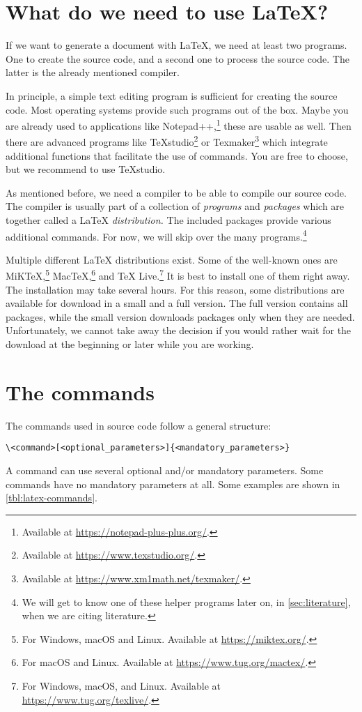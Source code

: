 \section{What do we need to use \LaTeX{}?}
\label{subsec:what-we-need}

If we want to generate a  document with \LaTeX{}, we need at least two programs. 
One to create the source code, and a second one to process the source code. 
The latter is the already mentioned compiler.

In principle, a simple text editing program is sufficient for creating the source code. 
Most operating systems provide such programs out of the box. 
Maybe you are already used to applications like Notepad++,\footnote{Available at \url{https://notepad-plus-plus.org/}.} these are usable as well. 
Then there are advanced programs like \TeX{}studio\footnote{Available at \url{https://www.texstudio.org/}.} or Texmaker\footnote{Available at \url{https://www.xm1math.net/texmaker/}.} which integrate additional functions that facilitate the use of commands.
You are free to choose, but we recommend to use \TeX{}studio.

As mentioned before, we need a compiler to be able to compile our source code.
The compiler is usually part of a collection of \emph{programs} and \emph{packages} which are together called a \LaTeX{} \emph{distribution}\textit{.} 
The included packages provide various additional commands. 
For now, we will skip over the many programs.\footnote{We will get to know one of these helper programs later on, in \ref{sec:literature}, when we are citing literature.}

Multiple different \LaTeX{} distributions exist. 
Some of the well-known ones are MiK\TeX,\footnote{For Windows, macOS and Linux. Available at \url{https://miktex.org/}.} Mac\TeX,\footnote{For macOS and Linux. Available at \url{https://www.tug.org/mactex/}.} and \TeX{} Live.\footnote{For Windows, macOS, and Linux. Available at \url{https://www.tug.org/texlive/}.}
It is best to install one of them right away. 
The installation may take several hours. 
For this reason, some distributions are available for download in a small and a full version. 
The full version contains all packages, while the small version downloads packages only when they are needed.
Unfortunately, we cannot take away the decision if you would rather wait for the download at the beginning or later while you are working.

\section{The commands}
\label{subsec:command-structure}
The commands used in source code follow a general structure:
\begin{verbatim}
\<command>[<optional_parameters>]{<mandatory_parameters>}
\end{verbatim}
A command can use several optional and/or mandatory parameters. 
Some commands have no mandatory parameters at all. 
Some examples are shown in \cref{tbl:latex-commands}.

